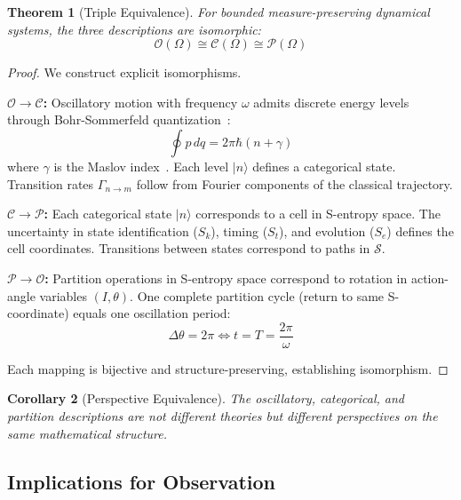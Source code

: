 \documentclass[aps,prd,twocolumn,superscriptaddress,floatfix,nofootinbib]{revtex4-2}
\newtheorem{theorem}{Theorem}[section]
\newtheorem{corollary}[theorem]{Corollary}
\theoremstyle{remark}
\newcommand{\Sk}{S_k}
\newcommand{\St}{S_t}
\newcommand{\Se}{S_e}
\newcommand{\Sspace}{\mathcal{S}}
\newcommand{\Pcat}{\mathcal{P}}
\newcommand{\Ocat}{\mathcal{O}}
\newcommand{\Ccat}{\mathcal{C}}
\begin{document}
\begin{theorem}[Triple Equivalence]
\label{thm:triple_equiv}
For bounded measure-preserving dynamical systems, the three descriptions are isomorphic:
\begin{equation}
\Ocat(\Omega) \cong \Ccat(\Omega) \cong \Pcat(\Omega)
\end{equation}
\end{theorem}

\begin{proof}
We construct explicit isomorphisms.

\textbf{$\Ocat \to \Ccat$:} Oscillatory motion with frequency $\omega$ admits discrete energy levels through Bohr-Sommerfeld quantization~\cite{bohr1913,sommerfeld1916}:
\begin{equation}
\oint p \, dq = 2\pi\hbar(n + \gamma)
\end{equation}
where $\gamma$ is the Maslov index~\cite{maslov1965}. Each level $|n\rangle$ defines a categorical state. Transition rates $\Gamma_{n \to m}$ follow from Fourier components of the classical trajectory.

\textbf{$\Ccat \to \Pcat$:} Each categorical state $|n\rangle$ corresponds to a cell in S-entropy space. The uncertainty in state identification ($\Sk$), timing ($\St$), and evolution ($\Se$) defines the cell coordinates. Transitions between states correspond to paths in $\Sspace$.

\textbf{$\Pcat \to \Ocat$:} Partition operations in S-entropy space correspond to rotation in action-angle variables $(I, \theta)$. One complete partition cycle (return to same S-coordinate) equals one oscillation period:
\begin{equation}
\Delta\theta = 2\pi \iff t = T = \frac{2\pi}{\omega}
\end{equation}

Each mapping is bijective and structure-preserving, establishing isomorphism.
\end{proof}

\begin{corollary}[Perspective Equivalence]
\label{cor:perspective}
The oscillatory, categorical, and partition descriptions are not different theories but different perspectives on the same mathematical structure.
\end{corollary}

\subsection{Implications for Observation}
\end{document}
